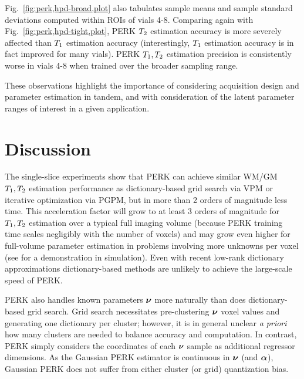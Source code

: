 Fig.~\ref{fig:perk,hpd-broad,plot}
also tabulates sample means and sample standard deviations
computed within ROIs of vials 4-8.
Comparing again with Fig.~\ref{fig:perk,hpd-tight,plot},
PERK $T_2$ estimation accuracy
is more severely affected 
than $T_1$ estimation accuracy
(interestingly,
$T_1$ estimation accuracy 
is in fact improved for many vials).
PERK $T_1,T_2$ estimation precision
is consistently worse in vials 4-8
when trained over the broader sampling range.

These observations highlight the importance 
of considering acquisition design
and parameter estimation in tandem,
and with consideration
of the latent parameter ranges of interest
in a given application.

\section{Discussion}
\label{s,perk,disc}

The single-slice experiments show
that PERK can achieve similar 
WM/GM $T_1,T_2$ estimation performance 
as dictionary-based grid search via VPM
or iterative optimization via PGPM,
but in more than 2 orders of magnitude less time.
This acceleration factor will grow
to at least 3 orders of magnitude 
for $T_1,T_2$ estimation 
over a typical full imaging volume
(because PERK training time scales negligibly 
with the number of voxels) and
may grow even higher
for full-volume parameter estimation
in problems involving 
more unknowns per voxel 
(see \cite{nataraj:17:dfm}
for a demonstration in simulation).
Even with recent low-rank dictionary approximations 
\cite{%
	mcgivney:14:scf,%
	cauley:15:fgm,%
	asslander::lra,%
	yang::lra%
}
dictionary-based methods are unlikely 
to achieve the large-scale speed 
of PERK.

PERK also handles known parameters $\boldsymbol{\nu}$ more naturally
than does dictionary-based grid search.
Grid search necessitates pre-clustering $\boldsymbol{\nu}$ voxel values
and generating one dictionary per cluster;
however,
it is in general unclear \emph{a priori} 
how many clusters are needed
to balance accuracy and computation.
In contrast,
PERK simply considers the coordinates 
of each $\boldsymbol{\nu}$ sample
as additional regressor dimensions.
As the Gaussian PERK estimator 
is continuous in $\boldsymbol{\nu}$ (and $\boldsymbol{\alpha}$),
Gaussian PERK does not suffer 
from either cluster (or grid) 
quantization bias.

